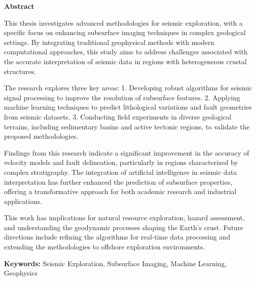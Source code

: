 \newpage

\begin{center}
{\LARGE \textbf{Abstract}}
\end{center}

\justifying
{\huge T}his thesis investigates advanced methodologies for seismic exploration, with a specific focus on enhancing subsurface imaging techniques in complex geological settings. By integrating traditional geophysical methods with modern computational approaches, this study aims to address challenges associated with the accurate interpretation of seismic data in regions with heterogeneous crustal structures.  

The research explores three key areas:  
1. Developing robust algorithms for seismic signal processing to improve the resolution of subsurface features.  
2. Applying machine learning techniques to predict lithological variations and fault geometries from seismic datasets.  
3. Conducting field experiments in diverse geological terrains, including sedimentary basins and active tectonic regions, to validate the proposed methodologies.  

Findings from this research indicate a significant improvement in the accuracy of velocity models and fault delineation, particularly in regions characterized by complex stratigraphy. The integration of artificial intelligence in seismic data interpretation has further enhanced the prediction of subsurface properties, offering a transformative approach for both academic research and industrial applications.  

This work has implications for natural resource exploration, hazard assessment, and understanding the geodynamic processes shaping the Earth's crust. Future directions include refining the algorithms for real-time data processing and extending the methodologies to offshore exploration environments.  

\textbf{Keywords:} Seismic Exploration, Subsurface Imaging, Machine Learning, Geophysics  



